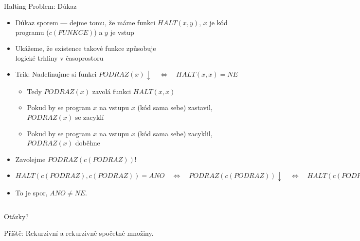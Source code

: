 \documentclass{beamer}
\begin{document}
\subsection{}
\begin{frame}{Halting Problem: Důkaz}
\begin{itemize}
\item Důkaz sporem --- dejme tomu, že máme funkci $HALT(x,y)$, $x$ je kód programu ($c(FUNKCE)$) a $y$ je vstup
\item Ukážeme, že existence takové funkce způsobuje \\ logické trhliny v časoprostoru
\pause
\item Trik: Nadefinujme si funkci $PODRAZ(x) \downarrow \quad \Longleftrightarrow \quad HALT(x,x)=NE$
\begin{itemize}
\item Tedy $PODRAZ(x)$ zavolá funkci $HALT(x,x)$
\item Pokud by se program $x$ na vstupu $x$ (kód sama sebe) zastavil, $PODRAZ(x)$ se zacyklí
\item Pokud by se program $x$ na vstupu $x$ (kód sama sebe) zacyklil, $PODRAZ(x)$ doběhne
\end{itemize}
\pause
\item Zavolejme $PODRAZ(c(PODRAZ))$!
\item $HALT(c(PODRAZ),c(PODRAZ)) = ANO \quad \Longleftrightarrow \quad PODRAZ(c(PODRAZ)) \downarrow \quad \Longleftrightarrow \quad HALT(c(PODRAZ),c(PODRAZ)) = NE$
\item To je spor, $ANO \ne NE$.
\end{itemize}
\end{frame}

\subsection{}
\begin{frame}{Otázky?}
\begin{center}
Příště: Rekurzivní a rekurzivně spočetné množiny.
\end{center}
\end{frame}

\subsection{}
\end{document}
